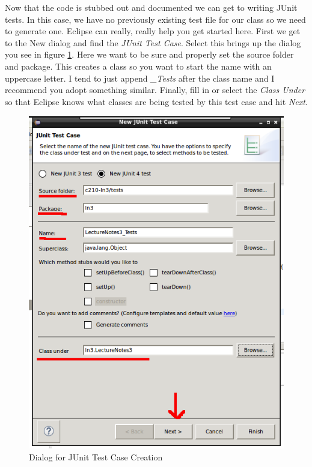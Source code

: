 \documentclass[]{tufte-handout}
\begin{document}
Now that the code is stubbed out and documented we can get to writing JUnit tests. In this case, we have no previously existing test file for our class so we need to generate one. Eclipse can really, really help you get started here. First we get to the New dialog and find the \textit{JUnit Test Case}. Select this brings up the dialog you see in figure \ref{fig:newtest}.  Here we want to be sure and 	properly set the source folder and package. This creates a class so you want to start the name with an uppercase letter. I tend to just append \textit{\_Tests} after the class name and I recommend you adopt something similar. Finally, fill in or select the \textit{Class Under} so that Eclipse knows what classes are being tested by this test case and hit \textit{Next}.

\vspace{.1in}
\begin{center}
\begin{figure}[!htb]
\includegraphics[scale=.5]{Eclipse-NewJUnitCase.png}
\caption{Dialog for JUnit Test Case Creation} 
\label{fig:newtest}
\end{figure}
\end{center}
\vspace{.1in}
\end{document}
